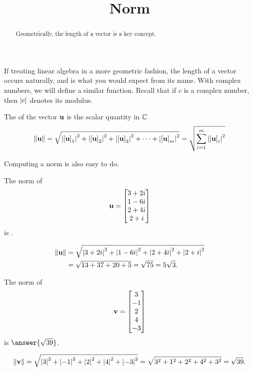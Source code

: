 \documentclass{ximera}
\title{Norm}
\begin{document}
\begin{abstract}
  Geometrically, the length of a vector is a key concept.
\end{abstract}
\maketitle

If treating linear algebra in a more geometric fashion, the length of
a vector occurs naturally, and is what you would expect from its name.
With complex numbers, we will define a similar function.  Recall that
if $c$ is a complex number, then $\left\lvert c\right\rvert$ denotes its modulus.

\begin{definition}
  The  of the vector $\mathbf{u}$ is the scalar quantity in $\mathbb{C}$
  \[
    \left\lVert\mathbf{u}\right\rVert=
    \sqrt{
      \left\lvert\left\lbrack\mathbf{u}\right\rbrack_{1}\right\rvert^2+
      \left\lvert\left\lbrack\mathbf{u}\right\rbrack_{2}\right\rvert^2+
      \left\lvert\left\lbrack\mathbf{u}\right\rbrack_{3}\right\rvert^2+
      \cdots+
      \left\lvert\left\lbrack\mathbf{u}\right\rbrack_{m}\right\rvert^2
    }
    =
    \sqrt{\sum_{i=1}^{m}\left\lvert\left\lbrack\mathbf{u}\right\rbrack_{i}\right\rvert^2}
  \]
\end{definition}

Computing a norm is also easy to do.

\begin{example}
The norm of
\[
\mathbf{u}=\begin{bmatrix}3+2i\\1-6i\\2+4i\\2+i\end{bmatrix}
\]
is .
\begin{hint}
  \begin{align*}
    \left\lVert\mathbf{u}\right\rVert&=
                     \sqrt{\left\lvert3+2i\right\rvert^2+\left\lvert1-6i\right\rvert^2+\left\lvert2+4i\right\rvert^2+\left\lvert2+i\right\rvert^2}\\
                   &=\sqrt{13+37+20+5}=\sqrt{75}=5\sqrt{3}.
  \end{align*}
\end{hint}
\end{example}

\begin{example}
  The norm of
  \[
    \mathbf{v}=\begin{bmatrix}3\\-1\\2\\4\\-3\end{bmatrix}
  \]
  is $\answer{\sqrt{39}}$.
  \begin{hint}
    \[
      \left\lVert\mathbf{v}\right\rVert=
      \sqrt{\left\lvert3\right\rvert^2+\left\lvert-1\right\rvert^2+\left\lvert2\right\rvert^2+\left\lvert4\right\rvert^2+\left\lvert-3\right\rvert^2}
      =\sqrt{3^2+1^2+2^2+4^2+3^2}=\sqrt{39}.
    \]
  \end{hint}
\end{example}
\end{document}

